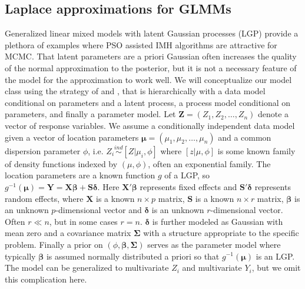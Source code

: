 \documentclass[12pt]{article}
\begin{document}
\subsection{Laplace approximations for GLMMs}\label{subsec:glm}
Generalized linear mixed models with latent Gaussian processes (LGP) provide a plethora of examples where PSO assisted IMH algorithms are attractive for MCMC. That latent parameters are a priori Gaussian often increases the quality of the normal approximation to the posterior, but it is not a necessary feature of the model for the approximation to work well. We will conceptualize our model class using the strategy of \citet{berliner1996hierarchical} and \citet{wikle2003hierarchical}, that is hierarchically with a data model conditional on parameters and a latent process, a process model conditional on parameters, and finally a parameter model. Let $\bm{Z}=(Z_1,Z_2,\dots,Z_n)$ denote a vector of response variables. We assume a conditionally independent data model given a vector of location parameters $\bm{\mu} = (\mu_1, \mu_2, \dots, \mu_n)$ and a common dispersion parameter $\phi$, i.e. $Z_i \stackrel{ind}{\sim} [Z|\mu_i,\phi]$ where $[z|\mu,\phi]$ is some known family of density functions indexed by $(\mu, \phi)$, often an exponential family. The location parameters are a known function $g$ of a LGP, so $g^{-1}(\bm{\mu}) = \bm{Y} = \bm{X}\bm{\beta} + \bm{S}\bm{\delta}$. Here $\bm{X}'\bm{\beta}$ represents fixed effects and $\bm{S}'\bm{\delta}$ represents random effects, where $\bm{X}$ is a known $n\times p$ matrix, $\bm{S}$ is a known $n\times r$ matrix, $\bm{\beta}$ is an unknown $p$-dimensional vector and $\bm{\delta}$ is an unknown $r$-dimensional vector. Often $r\ll n$, but in some cases $r=n$. $\bm{\delta}$ is further modeled as Gaussian with mean zero and a covariance matrix $\bm{\Sigma}$ with a structure appropriate to the specific problem. Finally a prior on $(\phi, \bm{\beta}, \bm{\Sigma})$ serves as the parameter model where typically $\bm{\beta}$ is assumed normally distributed a priori so that $g^{-1}(\bm{\mu})$ is an LGP. The model can be generalized to multivariate $Z_i$ and multivariate $Y_i$, but we omit this complication here. 
\end{document}
